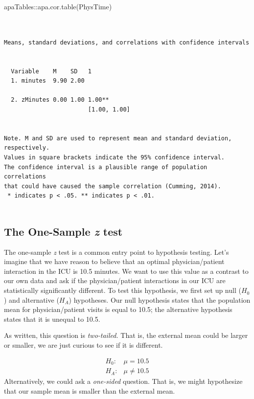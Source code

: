 \documentclass[
  11pt,
]{book}
\newenvironment{Shaded}{\begin{snugshade}}{\end{snugshade}}
\newcommand{\FunctionTok}[1]{\textcolor[rgb]{0.00,0.00,0.00}{#1}}
\newcommand{\NormalTok}[1]{#1}
\newcommand{\SpecialCharTok}[1]{\textcolor[rgb]{0.00,0.00,0.00}{#1}}
\begin{document}
\begin{Shaded}
\begin{Highlighting}[]
\NormalTok{apaTables}\SpecialCharTok{::}\FunctionTok{apa.cor.table}\NormalTok{(PhysTime)}
\end{Highlighting}
\end{Shaded}

\begin{verbatim}


Means, standard deviations, and correlations with confidence intervals
 

  Variable    M    SD   1           
  1. minutes  9.90 2.00             
                                    
  2. zMinutes 0.00 1.00 1.00**      
                        [1.00, 1.00]
                                    

Note. M and SD are used to represent mean and standard deviation, respectively.
Values in square brackets indicate the 95% confidence interval.
The confidence interval is a plausible range of population correlations 
that could have caused the sample correlation (Cumming, 2014).
 * indicates p < .05. ** indicates p < .01.
 
\end{verbatim}

\hypertarget{the-one-sample-z-test}{%
\subsection{\texorpdfstring{The One-Sample \emph{z} test}{The One-Sample z test}}\label{the-one-sample-z-test}}

The one-sample \emph{z} test is a common entry point to hypothesis testing. Let's imagine that we have reason to believe that an optimal physician/patient interaction in the ICU is 10.5 minutes. We want to use this value as a contrast to our own data and ask if the physician/patient interactions in our ICU are statistically significantly different. To test this hypothesis, we first set up null (\(H_0\)) and alternative (\(H_A\)) hypotheses. Our null hypothesis states that the population mean for physician/patient visits is equal to 10.5; the alternative hypothesis states that it is unequal to 10.5.

As written, this question is \emph{two-tailed.} That is, the external mean could be larger or smaller, we are just curious to see if it is different.

\[
\begin{array}{ll}
H_0: & \mu = 10.5 \\
H_A: & \mu \neq 10.5
\end{array}
\]
Alternatively, we could ask a \emph{one-sided} question. That is, we might hypothesize that our sample mean is smaller than the external mean.
\end{document}
